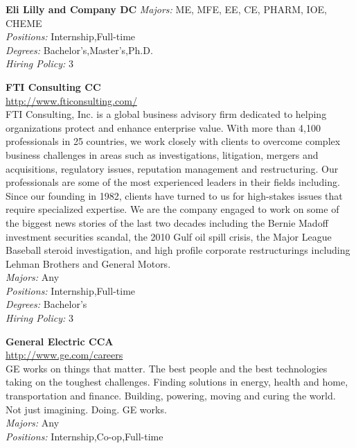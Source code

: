 \documentclass[twoside]{article}
\begin{document}
\begin{center}
\begin{multicols}{2}
\begin{minipage}{.95\columnwidth}{\Large\bf Eli Lilly and Company \hfill DC}
    \emph{Majors:} ME, MFE, EE, CE, PHARM, IOE, CHEME\\
    \emph{Positions:} Internship,Full-time\\
    \emph{Degrees:} Bachelor's,Master's,Ph.D.\\
    \emph{Hiring Policy:} 3\\
\end{minipage}
 \begin{minipage}{.95\columnwidth}{\Large\bf FTI Consulting \hfill CC}\\
    \url{http://www.fticonsulting.com/}\\
    FTI Consulting, Inc. is a global business advisory firm dedicated to helping organizations protect and enhance enterprise value. With more than 4,100 professionals in 25 countries, we work closely with clients to overcome complex business challenges in areas such as investigations, litigation, mergers and acquisitions, regulatory issues, reputation management and restructuring. Our professionals are some of the most experienced leaders in their fields including. Since our founding in 1982, clients have turned to us for high-stakes issues that require specialized expertise. We are the company engaged to work on some of the biggest news stories of the last two decades including the Bernie Madoff investment securities scandal, the 2010 Gulf oil spill crisis, the Major League Baseball steroid investigation, and high profile corporate restructurings including Lehman Brothers and General Motors.\\
    \emph{Majors:} Any\\
    \emph{Positions:} Internship,Full-time\\
    \emph{Degrees:} Bachelor's\\
    \emph{Hiring Policy:} 3\\
\end{minipage}
 \begin{minipage}{.95\columnwidth}{\Large\bf General Electric \hfill CCA}\\
    \url{http://www.ge.com/careers}\\
    GE works on things that matter. The best people and the best technologies taking on the toughest challenges. Finding solutions in energy, health and home, transportation and finance. Building, powering, moving and curing the world. Not just imagining. Doing. GE works.\\
    \emph{Majors:} Any\\
    \emph{Positions:} Internship,Co-op,Full-time\\

\end{minipage}
\end{multicols}
\end{center}
\end{document}
